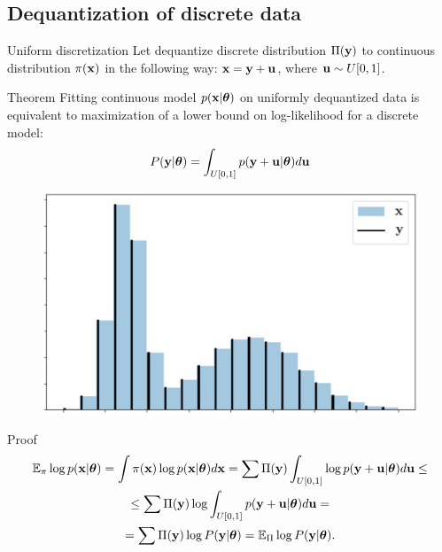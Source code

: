 \subsection{Dequantization of discrete data}
\begin{frame}{Uniform discretization}
	Let dequantize discrete distribution $\Pi(\mathbf{y})$ to continuous distribution $\pi(\mathbf{x})$ in the following way: $\mathbf{x} = \mathbf{y} + \mathbf{u}$, where  $\mathbf{u} \sim U[0, 1]$.
	\begin{minipage}{0.7\linewidth}	
		\begin{block}{Theorem}
			Fitting continuous model $p(\mathbf{x} | \boldsymbol{\theta})$ on uniformly dequantized data is equivalent to maximization of a lower bound on log-likelihood for a discrete model:
			\vspace{-0.2cm}
			\[
			P(\mathbf{y} | \boldsymbol{\theta}) = \int_{U[0, 1]} p(\mathbf{y} + \mathbf{u} | \boldsymbol{\theta}) d \mathbf{u}
			\]
			\vspace{-0.5cm} 
		\end{block}
	\end{minipage}%
	\begin{minipage}{0.3\linewidth}
		\begin{figure}
			\centering
			\includegraphics[width=\linewidth,height=0.8\linewidth]{figs/uniform_dequantization.png}
		\end{figure}
	\end{minipage}

	\begin{block}{Proof}
		\vspace{-0.8cm}
		{\small
		\begin{multline*}
			\mathbb{E}_{\pi} \log p(\mathbf{x} | \boldsymbol{\theta}) = \int \pi(\mathbf{x}) \log p(\mathbf{x} | \boldsymbol{\theta}) d \mathbf{x} = \sum \Pi(\mathbf{y}) \int_{U[0,1]} \log p(\mathbf{y} + \mathbf{u} | \boldsymbol{\theta}) d \mathbf{u} \leq \\
			\leq \sum \Pi(\mathbf{y}) \log \int_{U[0,1]}  p(\mathbf{y} + \mathbf{u} | \boldsymbol{\theta}) d \mathbf{u} = \\ = \sum \Pi(\mathbf{y}) \log P(\mathbf{y} | \boldsymbol{\theta}) = \mathbb{E}_{\Pi} \log P(\mathbf{y} | \boldsymbol{\theta}).
		\end{multline*}
		}
	\end{block}
\end{frame}
